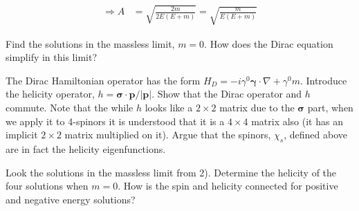 \documentclass[working, oneside]{../../../Preambles/tuftebook}
\begin{document}
\begin{solution}
\begin{align*}
\Rightarrow A
&= \sqrt{\frac{2m}{2E (E + m)}} = \sqrt{\frac{m}{E (E + m)}}
\end{align*}
\end{solution}

\begin{exercise}[2]
Find the solutions in the massless limit, \( m = 0 \). How does the Dirac equation simplify in this limit?
\end{exercise}

\begin{exercise}[3]
The Dirac Hamiltonian operator has the form \( H_D = -i \gamma^0 \boldsymbol{\gamma} \cdot \nabla + \gamma^0 m \). Introduce the helicity operator, \( h = \boldsymbol{\sigma} \cdot \mathbf{p} / |\mathbf{p}| \). Show that the Dirac operator and \( h \) commute. Note that the while \( h \) looks like a \( 2 \times 2 \) matrix due to the \( \boldsymbol{\sigma} \) part, when we apply it to 4-spinors it is understood that it is a \( 4 \times 4 \) matrix also (it has an implicit \( 2 \times 2 \) matrix multiplied on it). Argue that the spinors, \( \chi_s \), defined above are in fact the helicity eigenfunctions.
\end{exercise}

\begin{exercise}[4]
Look the solutions in the massless limit from 2). Determine the helicity of the four solutions when \( m = 0 \). How is the spin and helicity connected for positive and negative energy solutions?
\end{exercise}
\end{document}
